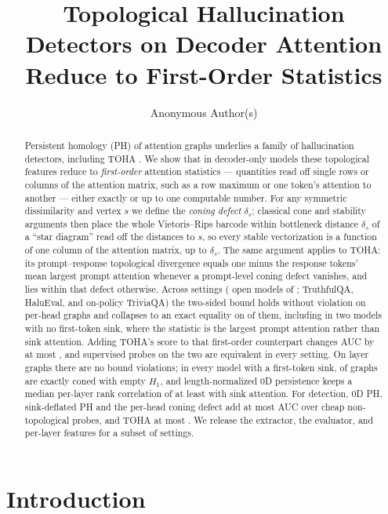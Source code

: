 \documentclass{article}
\title{Topological Hallucination Detectors on Decoder Attention Reduce to First-Order Statistics}
\author{Anonymous Author(s)}
\theoremstyle{definition}
\newcommand{\defect}{\delta}
\begin{document}
\maketitle

\begin{abstract}
Persistent homology (PH) of attention graphs underlies a family of hallucination detectors, including TOHA \citep{toha}. We show that in decoder-only models these topological features reduce to \emph{first-order} attention statistics --- quantities read off single rows or columns of the attention matrix, such as a row maximum or one token's attention to another --- either exactly or up to one computable number. For any symmetric dissimilarity and vertex $s$ we define the \emph{coning defect} $\defect_s$; classical cone and stability arguments then place the whole Vietoris--Rips barcode within bottleneck distance $\defect_s$ of a ``star diagram'' read off the distances to $s$, so every stable vectorization is a function of one column of the attention matrix, up to $\defect_s$. The same argument applies to TOHA: its prompt--response topological divergence equals one minus the response tokens' mean largest prompt attention whenever a prompt-level coning defect vanishes, and lies within that defect otherwise. Across \NSettings{} settings (\NModels{} open models of \ModelSizeRange{}; TruthfulQA, HaluEval, and on-policy TriviaQA) the two-sided bound holds without violation on \TohaCells{} per-head graphs and collapses to an exact equality on \TohaConedRange{} of them, including in two models with no first-token sink, where the statistic is the largest prompt attention rather than sink attention. Adding TOHA's score to that first-order counterpart changes AUC by at most \TohaLFMaxpMax{}, and supervised probes on the two are equivalent in every setting. On \NCellsTotal{} layer graphs there are no bound violations; in every model with a first-token sink, \PctConedRange{} of graphs are exactly coned with empty $H_1$, and length-normalized $0$D persistence keeps a median per-layer rank correlation of at least \RhoMin{} with sink attention. For detection, $0$D PH, sink-deflated PH and the per-head coning defect add at most \TopoNTMaxAbs{} AUC over cheap non-topological probes, and TOHA at most \TohaNTMaxAll{}. We release the extractor, the evaluator, and per-layer features for a subset of settings.
\end{abstract}

\section{Introduction}
\label{sec:intro}
\end{document}
